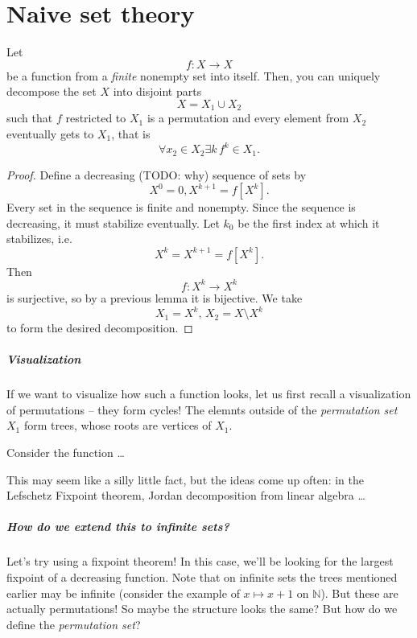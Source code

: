 \chapter{Naive set theory}

\begin{lemma}
    Let
    \[
        f: X \to X
    \]
    be a function from a \emph{finite} nonempty set into itself. Then, you can uniquely decompose the set \( X \) into disjoint parts
    \[
        X = X_1 \cup X_2
    \]
    such that \( f \) restricted to \( X_1 \) is a permutation and every element from \( X_2 \) eventually gets to \( X_1 \), that is
    \[
        \forall x_2 \in X_2 \exists k \, f^k \in X_1.
    \]
\end{lemma}

\begin{proof}

    Define a decreasing (TODO: why) sequence of sets by
    \[
        X^0 = 0, X^{k+1} = f[X^k].
    \]
    Every set in the sequence is finite and nonempty. Since the sequence is decreasing, it must stabilize eventually. Let \( k_0 \) be the first index at which it stabilizes, i.e.
    \[
        X^k = X^{k+1} = f[X^k].
    \]
    Then
    \[
        f: X^k \to X^k
    \]
    is surjective, so by a previous lemma it is bijective. We take
    \[
        X_1 = X^k,\,X_2 = X \setminus X^k
    \]
    to form the desired decomposition.

\end{proof}

\paragraph{Visualization} If we want to visualize how such a function looks, let us first recall a visualization of permutations -- they form cycles! The elemnts outside of the \emph{permutation set} \(X_1\) form trees, whose roots are vertices of \( X_1 \).

\begin{example}
    Consider the function \ldots
\end{example}

This may seem like a silly little fact, but the ideas come up often: in the Lefschetz Fixpoint theorem, Jordan decomposition from linear algebra \ldots

\paragraph{How do we extend this to infinite sets?} Let's try using a fixpoint theorem! In this case, we'll be looking for the largest fixpoint of a decreasing function.
Note that on infinite sets the trees mentioned earlier may be infinite (consider the example of \( x \mapsto x+1 \) on \(\mathbb{N}\)). But these are actually permutations! So maybe the structure looks the same? But how do we define the \emph{permutation set}?

